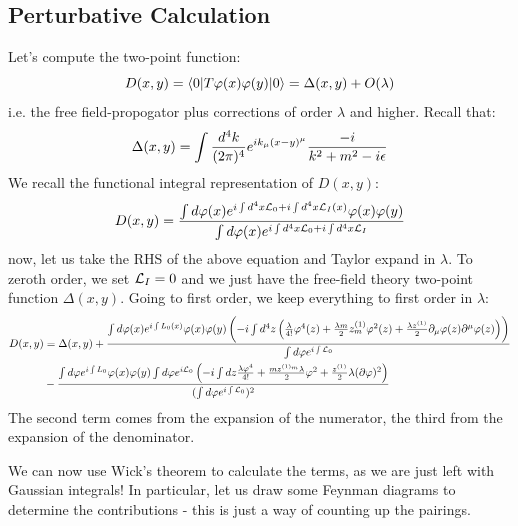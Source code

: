 \subsection{Perturbative Calculation}
Let's compute the two-point function:
\begin{equation}
   D(x, y) = \bra{0}T\varphi(x)\varphi(y)\ket{0} = \Delta(x, y) + O(\lambda)
\end{equation}
i.e. the free field-propogator plus corrections of order $\lambda$ and higher. Recall that:
\begin{equation}
   \Delta(x, y) = \int \frac{d^4k}{(2\pi)^4}e^{ik_\mu (x - y)^\mu} \frac{-i}{k^2 + m^2 - i\epsilon}
\end{equation}
We recall the functional integral representation of $D(x, y)$:
\begin{equation}
   D(x, y) = \frac{\int d\varphi(x) e^{i\int d^4x \L_0 + i\int d^4x \L_I(x)}\varphi(x)\varphi(y)}{\int d\varphi(x) e^{i\int d^4x \L_0 + i\int d^4x\L_I}}
\end{equation}
now, let us take the RHS of the above equation and Taylor expand in $\lambda$. To zeroth order, we set $\mathcal{L}_I = 0$ and we just have the free-field theory two-point function $\Delta(x, y)$. Going to first order, we keep everything to first order in $\lambda$:
\begin{equation}
   \begin{split}
      D(x, y) &= \Delta(x, y) + \frac{\int d\varphi(x) e^{i\int L_0(x)}\varphi(x)\varphi(y) \left(-i\int d^4z \left(\frac{\lambda}{4!}\varphi^4(z) + \frac{\lambda m}{2}z_m^{(1)}\varphi^2(z) + \frac{\lambda z^{(1)}}{2}\p_\mu \varphi(z) \p^\mu \varphi(z)\right)\right)}{\int d\varphi e^{i\int \L_0}}
      \\ &- \frac{\int d\varphi e^{i\int L_0}\varphi(x)\varphi(y) \int d\varphi e^{i\L_0}\left(-i \int dz \frac{\lambda \varphi^4}{4!} + \frac{mz^{(1)_m}\lambda}{2}\varphi^2 + \frac{z^{(1)}}{2}\lambda (\p \varphi)^2\right)}{(\int d\varphi e^{i\int \L_0})^2}
   \end{split}
\end{equation}
The second term comes from the expansion of the numerator, the third from the expansion of the denominator.

We can now use Wick's theorem to calculate the terms, as we are just left with Gaussian integrals! In particular, let us draw some Feynman diagrams to determine the contributions - this is just a way of counting up the pairings.

